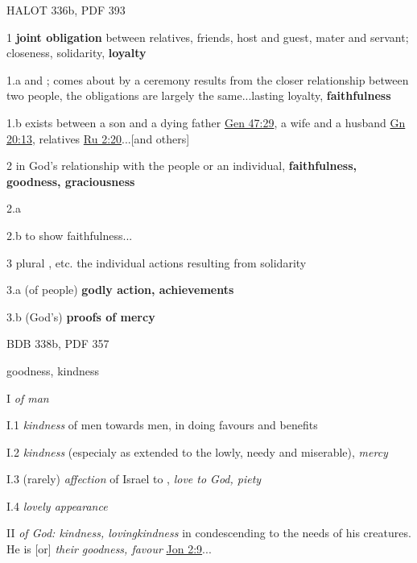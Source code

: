 				\begin{compactdesc}
					\item[HALOT 336b, PDF 393] \phantom{.}
						\begin{compactitem}
							\item[1] \textbf{joint obligation} between relatives, friends, host and guest, mater and servant; closeness, solidarity, \textbf{loyalty}
							\item[1.a]  and \he{b*:riyt};  comes about by a ceremony  results from the closer relationship between two people, the obligations are largely the same...lasting loyalty, \textbf{faithfulness}
							\item[1.b]  exists between a son and a dying father \hyperref[GENESIS-47-29]{Gen 47:29}, a wife and a husband \hyperref[GENESIS-20-13]{Gn 20:13}, relatives \hyperref[RUTH-2-20]{Ru 2:20}...[and others]
							\item[2]  in God's relationship with the people or an individual, \textbf{faithfulness, goodness, graciousness}
							\item[2.a] 
							\item[2.b]  to show faithfulness...
							\item[3] plural ,  etc. the individual actions resulting from solidarity
							\item[3.a] (of people) \textbf{godly action, achievements}
							\item[3.b] (God's) \textbf{proofs of mercy}
						\end{compactitem}
					\item[BDB 338b, PDF 357] \phantom{.}
						\begin{compactitem}
							\item goodness, kindness
							\item[I] \textit{of man}
							\item[I.1] \textit{kindness} of men towards men, in doing favours and benefits
							\item[I.2] \textit{kindness} (especialy as extended to the lowly, needy and miserable), \textit{mercy}
							\item[I.3] (rarely) \textit{affection} of Israel to , \textit{love to God, piety}
							\item[I.4] \textit{lovely appearance}
							\item[II] \textit{of God: kindness, lovingkindness} in condescending to the needs of his creatures. He is  [or] \textit{their goodness, favour} \hyperref[JONAH-2-9]{Jon 2:9}...

\end{compactitem}
\end{compactdesc}

